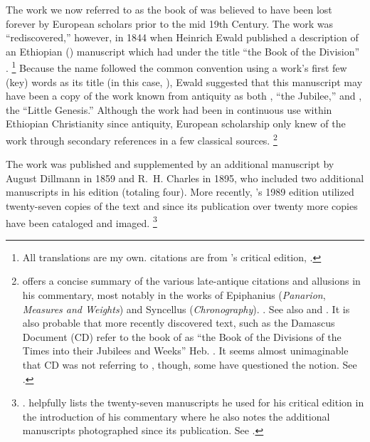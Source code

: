 
\nocite{dillamnn_jbw_kleine}
\nocite{ewald_zkm1844}


The work we now referred to as the book of \jub was believed to have been lost forever by European scholars prior to the mid 19th Century. The work was ``rediscovered,'' however, in 1844 when Heinrich Ewald published a description of an Ethiopian (\geez) manuscript which had under the title ``the Book of the Division'' .%
        \footnote{All translations are my own. \geez citations are from \vanderkam's critical edition, \cite*{vanderkam1989}.}
Because the name followed the common convention using a work's first few (key) words as its title (in this case, ), Ewald suggested that this manuscript may have been a copy of the work known from antiquity as both , ``the Jubilee,'' and , the ``Little Genesis.''\autocite[176--179]{ewald_zkm1844} Although the work had been in continuous use within Ethiopian Christianity since antiquity, European scholarship only knew of the work through secondary references in a few classical sources.%
        \footnote{\vanderkam offers a concise summary of the various late-antique citations and allusions in his commentary, most notably in the works of Epiphanius (\emph{Panarion}, \emph{Measures and Weights}) and Syncellus (\emph{Chronography}).
                \cite[1:10--14]{vanderkam2018}. See also 
                \cite{reed_kister-etal2015} and 
                \cite{kreps_ch2018}.
        It is also probable that more recently discovered text, such as the Damascus Document (CD) refer to the book of \jub as 
        ``the Book of the Divisions of the Times into their Jubilees and Weeks'' Heb. . It seems almost unimaginable that CD was not referring to \jub, though, some have questioned the notion. See \cite[242--248]{dimant_vanderkam-etal2006}.}

The work was published and supplemented by an additional manuscript by August Dillmann in 1859\autocite{dillmann1859} and R.~H. Charles in 1895, who included two additional manuscripts in his edition (totaling four).\autocite{charles1895} More recently, \vanderkam's 1989 edition utilized twenty-seven copies of the text\autocite[1:xiv--xvi]{vanderkam1989} and since its publication over twenty more copies have been cataloged and imaged.%
        \footnote{%
                \cite{erho_bsoas2013}.
                \vanderkam helpfully lists the twenty-seven manuscripts he used for his critical edition in the introduction of his commentary where he also notes the additional manuscripts photographed since its publication. See 
                \cite[1:14--16]{vanderkam2018}.}

